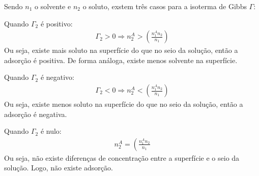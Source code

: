 \begin{multicols*}{2}
  Sendo $n_1$ o solvente e $n_2$ o soluto, exstem três casos para a isoterma de Gibbs $\Gamma$:
  \begin{corollary}
    Quando $\Gamma_2$ é positivo:
    \begin{gather}
      \Gamma_2 > 0 \Rightarrow n_2^A > \left( \frac{n_1^A n_2}{n_1} \right)
    \end{gather}
    Ou seja, existe mais soluto na superfície do que no seio da solução, então a adsorção é positiva. De forma análoga, existe menos solvente na superfície.

    Quando $\Gamma_2$ é negativo:
    \begin{gather}
      \Gamma_2 < 0 \Rightarrow n_2^A < \left( \frac{n_1^A n_2}{n_1} \right)
    \end{gather}
    Ou seja, existe menos soluto na superfície do que no seio da solução, então a adsorção é negativa.

    Quando $\Gamma_2$ é nulo:
    \begin{gather}
      n_2^A = \left( \frac{n_1^A n_2}{n_1}
    \end{gather}
    Ou seja, não existe diferenças de concentração entre a superfície e o seio da solução. Logo, não existe adsorção.
  \end{corollary}


\end{multicols*}
